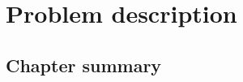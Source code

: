 \chapter{Problem description} \label{chap:problem}

\section*{}


\section{\evm} \label{sec:problem:evm}

\section{Chapter summary}

